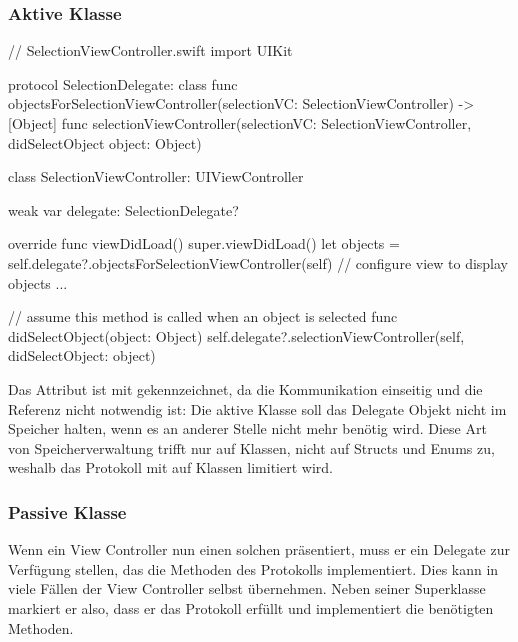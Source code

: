 \documentclass[parskip=half, final]{scrreprt}
\begin{document}
\subsubsection{Aktive Klasse}

\begin{swiftcode}
// SelectionViewController.swift
import UIKit

protocol SelectionDelegate: class {
    func objectsForSelectionViewController(selectionVC: SelectionViewController) -> [Object]
    func selectionViewController(selectionVC: SelectionViewController, didSelectObject object: Object)
}

class SelectionViewController: UIViewController {
    weak var delegate: SelectionDelegate?
    
    override func viewDidLoad() {
        super.viewDidLoad()
        let objects = self.delegate?.objectsForSelectionViewController(self)
        // configure view to display objects ...
    }

    // assume this method is called when an object is selected
    func didSelectObject(object: Object) {
        self.delegate?.selectionViewController(self, didSelectObject: object)
    }
}
\end{swiftcode}

Das  Attribut ist mit  gekennzeichnet, da die Kommunikation einseitig und die Referenz nicht notwendig ist: Die aktive Klasse soll das Delegate Objekt nicht im Speicher halten, wenn es an anderer Stelle nicht mehr benötig wird. Diese Art von Speicherverwaltung trifft nur auf Klassen, nicht auf Structs und Enums zu, weshalb das Protokoll mit  auf Klassen limitiert wird.

\subsubsection{Passive Klasse}

Wenn ein View Controller nun einen solchen  präsentiert, muss er ein Delegate zur Verfügung stellen, das die Methoden des  Protokolls implementiert. Dies kann in viele Fällen der View Controller selbst übernehmen. Neben seiner Superklasse markiert er also, dass er das Protokoll erfüllt und implementiert die benötigten Methoden.
\end{document}
